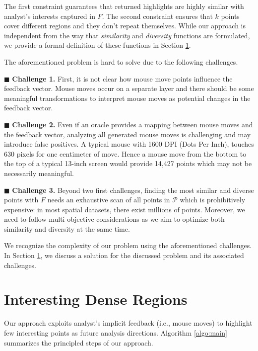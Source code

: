 \documentclass[sigconf,edbt]{acmart-edbt2019}
\begin{document}
The first constraint guarantees that returned highlights are highly similar with analyst's interests captured in $F$. The second constraint ensures that $k$ points cover different regions and they don't repeat themselves. While our approach is independent from the way that {\em similarity} and {\em diversity} functions are formulated, we provide a formal definition of these functions in Section \ref{sec:algo}.

\vspace{2pt}
The aforementioned problem is hard to solve due to the following challenges.

\vspace{3pt}
\noindent $\blacksquare$ {\bf Challenge 1.} First, it is not clear how mouse move points influence the feedback vector. Mouse moves occur on a separate layer and there should be some meaningful transformations to interpret mouse moves as potential changes in the feedback vector. 

\vspace{2pt}
\noindent $\blacksquare$ {\bf Challenge 2.} Even if an oracle provides a mapping between mouse moves and the feedback vector, analyzing all generated mouse moves is challenging and may introduce false positives. A typical mouse with 1600 DPI (Dots Per Inch), touches 630 pixels for one centimeter of move. Hence a mouse move from the bottom to the top of a typical 13-inch screen would provide 14,427 points which may not be necessarily meaningful.

\vspace{3pt}
\noindent $\blacksquare$ {\bf Challenge 3.} Beyond two first challenges, finding the most similar and diverse points with $F$ needs an exhaustive scan of all points in $\mathcal{P}$ which is prohibitively expensive: in most spatial datasets, there exist millions of points. Moreover, we need to follow multi-objective considerations as we aim to optimize both similarity and diversity at the same time.

\vspace{2pt}
We recognize the complexity of our problem using the aforementioned challenges. In Section \ref{sec:algo}, we discuss a solution for the discussed problem and its associated challenges.

\section{Interesting Dense Regions}
\label{sec:algo}
Our approach exploits analyst's implicit feedback (i.e., mouse moves) to highlight few interesting points as future analysis directions. Algorithm \ref{algo:main} summarizes the principled steps of our approach.
\end{document}
